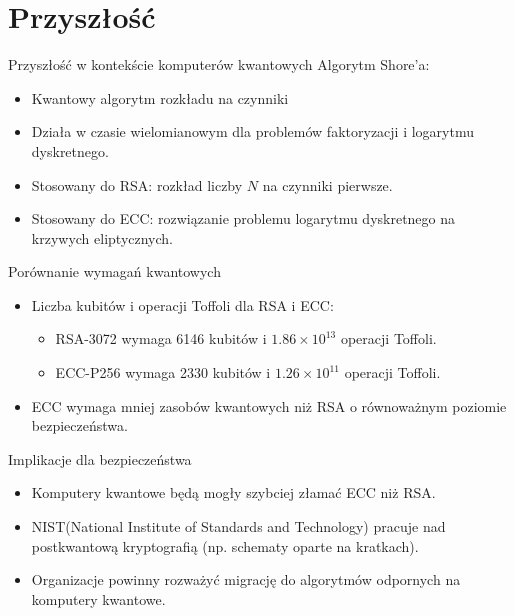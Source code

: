 \section{Przyszłość}
\begin{frame}{Przyszłość w kontekście komputerów kwantowych}
       Algorytm Shore'a:
        \begin{itemize}
            \item Kwantowy algorytm rozkładu na czynniki
            \item Działa w czasie wielomianowym dla problemów faktoryzacji i logarytmu dyskretnego.
            \item Stosowany do RSA: rozkład liczby $N$ na czynniki pierwsze.
            \item Stosowany do ECC: rozwiązanie problemu logarytmu dyskretnego na krzywych eliptycznych.
        \end{itemize}
\end{frame}
\begin{frame}{Porównanie wymagań kwantowych}
    \begin{itemize}
        \item Liczba kubitów i operacji Toffoli dla RSA i ECC: \cite{quantum}
        \begin{itemize}
            \item RSA-3072 wymaga 6146 kubitów i $1.86 \times 10^{13}$ operacji Toffoli.
            \item ECC-P256 wymaga 2330 kubitów i $1.26 \times 10^{11}$ operacji Toffoli.
        \end{itemize}
        \item ECC wymaga mniej zasobów kwantowych niż RSA o równoważnym poziomie bezpieczeństwa.
    \end{itemize}
\end{frame}
\begin{frame}{Implikacje dla bezpieczeństwa}
    \begin{itemize}
        \item Komputery kwantowe będą mogły szybciej złamać ECC niż RSA.
        \item NIST(National Institute of Standards and Technology) pracuje nad postkwantową kryptografią (np. schematy oparte na kratkach).
        \item Organizacje powinny rozważyć migrację do algorytmów odpornych na komputery kwantowe.
    \end{itemize}
\end{frame}
